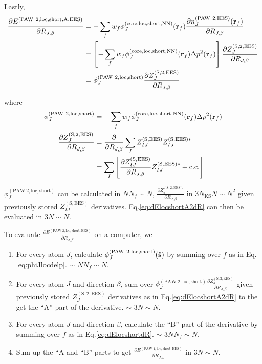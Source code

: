 \documentclass[paper=a4, fontsize=11pt]{article} %
\numberwithin{equation}{section} %
\numberwithin{figure}{section} %
\numberwithin{table}{section} %
\newcommand{\p}{\partial}
\newcommand{\br}{{\bf{r}}}
\newcommand{\hs}{{\hat{\bf{s}}}}
\newcommand{\rS}{{\mathrm{S}}}
\newcommand{\rEES}{{\mathrm{EES}}}
\newcommand{\rcore}{{\mathrm{core}}}
\newcommand{\rNN}{{\mathrm{NN}}}
\newcommand{\rshort}{{\mathrm{short}}}
\newcommand{\rcc}{{\mathrm{c.c.}}}
\newcommand{\rP}{{\mathrm{PAW}}}
\newcommand{\rA}{{\mathrm{A}}}
\newcommand{\rB}{{\mathrm{B}}}
\newcommand{\rlo}{{\mathrm{loc}}}
\newcommand{\RJb}{{R_{J,\beta}}}
\newcommand{\NKS}{{N_{\mathrm{KS}}}}
\begin{document}
Lastly,
\begin{equation}\label{eq:dElocshortA2dR}
\begin{split}
\frac{\p E^{(\rP\ 2,\rlo,\rshort,\rA,\rEES)}}{\p \RJb}
&= - \sum_f w_f \phi_J^{(\rcore,\rlo,\rshort,\rNN)}(\br_f)\frac{\p n_{J}^{(\rP\ 2,\rEES)}(\br_f)}{\p \RJb} \\
&= \left[- \sum_f w_f \phi_J^{(\rcore,\rlo,\rshort,\rNN)}(\br_f)\Delta p^2(\br_f)\right]\frac{\p Z_{J}^{(\rS,2,\rEES)}}{\p \RJb} \\
&=\phi_J^{(\rP\ 2,\rlo,\rshort)}\frac{\p Z_{J}^{(\rS,2,\rEES)}}{\p \RJb}\\
\end{split}
\end{equation}

where
\begin{equation}\label{eq:phiJlocdelp}
\begin{split}
\phi_J^{(\rP\ 2,\rlo,\rshort)} &= - \sum_f w_f \phi_J^{(\rcore,\rlo,\rshort,\rNN)}(\br_f)\Delta p^2(\br_f) \\
\frac{\p Z_{J}^{(\rS,2,\rEES)}}{\p \RJb} &=
\frac{\p}{\p \RJb} \sum_I Z_{IJ}^{(\rS,\rEES)}Z_{IJ}^{(\rS,\rEES)*}\\
&= \sum_I \left[\frac{\p Z_{IJ}^{(\rS,\rEES)}}{\p \RJb}Z_{IJ}^{(\rS,\rEES)*}+\rcc\right]\\
\end{split}
\end{equation}

$\phi_J^{(\rP\ 2,\rlo,\rshort)}$ can be calculated in $NN_f \sim N$, $\frac{\p Z_{J}^{(\rS,2,\rEES)}}{\p \RJb}$ in $3\NKS N \sim N^2$ given previously stored $Z_{IJ}^{(\rS,\rEES)}$ derivatives. Eq.\eqref{eq:dElocshortA2dR} can then be evaluated in $3 N \sim N$.

To evaluate $\frac{\p E^{(\rP\ 2,\rlo,\rshort,\rEES)}}{\p \RJb}$ on a computer, we
\begin{enumerate}
\item For every atom $J$, calculate $\phi_J^{(\rP\ 2,\rlo,\rshort)}(\hs)$ by summing over $f$ as in Eq.\eqref{eq:phiJlocdelp}. $\sim$ $N N_f \sim N$.
\item For every atom $J$ and direction $\beta$, sum over $\phi_J^{(\rP\ 2,\rlo,\rshort)}\frac{\p Z_{J}^{(\rS,2,\rEES)}}{\p \RJb}$ given previously stored $Z_{J}^{(\rS,2,\rEES)}$ derivatives as in Eq.\eqref{eq:dElocshortA2dR} to the get the ``$\rA$'' part of the derivative. $\sim$ $3N \sim N$.
\item For every atom $J$ and direction $\beta$, calculate the ``$\rB$'' part of the derivative by summing over $f$ as in Eq.\eqref{eq:dElocshortdR}. $\sim$ $3N N_f \sim N$.
\item Sum up the ``$\rA$ and ``$\rB$'' parts to get $\frac{\p E^{(\rP\ 1,\rlo,\rshort,\rEES)}}{\p \RJb}$ in $3 N\sim N$.
\end{enumerate}
\end{document}
